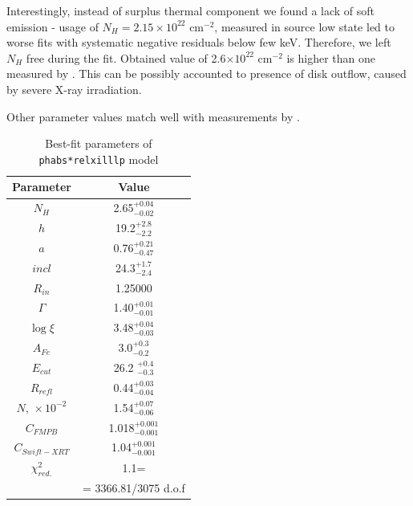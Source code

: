 \documentclass[a4paper,fleqn,usenatbib]{mnras}
\begin{document}
Interestingly, instead of surplus thermal component we found a lack of soft emission - usage of $N_{H} = 2.15\times10^{22}$ cm$^{-2}$, measured in source low state \citep{furst16} led to worse fits with systematic negative residuals below few keV. Therefore, we left $N_{H}$ free during the fit. Obtained value of 2.6$\times10^{22}$ cm$^{-2}$ is higher than one measured by \cite{furst16}. This can be possibly accounted to presence of disk outflow, caused by severe X-ray irradiation. 

Other parameter values match well with measurements by \cite{miller15_nust}. 

\begin{table}
\noindent
\centering
\caption{Best-fit parameters of \texttt{phabs*relxilllp} model}
\label{tab:fullfit}
\centering
\begin{tabular}{|c|c|}
\hline\hline
Parameter & Value \\
\hline
$N_{H}$ &   2.65$^{+0.04}_{-0.02}$ \\   
$h$   &  19.2$^{+2.8}_{-2.2}$ \\
$a$    & 0.76$^{+0.21}_{-0.47}$   \\
$incl$ & 24.3$^{+1.7}_{-2.4}$ \\
$R_{in}$  & 1.25000 \\ 
$\Gamma$& 1.40$^{+0.01}_{-0.01}$   \\
$\log{\xi}$ &  3.48$^{+0.04}_{-0.03}$ \\
$A_{Fe}$   &  3.0$^{+0.3}_{-0.2}$  \\        
$E_{cut}$    &       26.2 $^{+0.4}_{-0.3}$    \\
$R_{refl}$  &         0.44$^{+0.03}_{-0.04}$    \\
$N,\,\times10^{-2}$          &      1.54$^{+0.07}_{-0.06}$ \\
$C_{FMPB}$ & 1.018$^{+0.001}_{-0.001}$    \\
$C_{Swift-XRT}$    &   1.04$^{+0.001}_{-0.001}$\\
$\chi^{2}_{red.}$    &   1.1=\\ 
              &= 3366.81/3075 d.o.f\\

\hline
\end{tabular}
\end{table}
\end{document}
